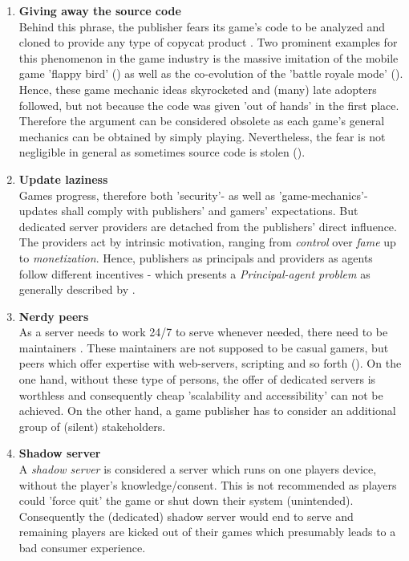 \begin{enumerate}
	\item \textbf{Giving away the source code} \\
	Behind this phrase, the publisher fears its game's code to be analyzed and cloned to provide any type of copycat product \cite[2]{Li.2014}.
	Two prominent examples for this phenomenon in the game industry is the massive imitation of the mobile game 'flappy bird' (\cite{Li.2014})
	as well as the co-evolution of the 'battle royale mode' (\cite{KooistraJ..2018}).
	Hence, these game mechanic ideas skyrocketed and (many) late adopters followed, but not because the code was given 'out of hands' in the first place.
	Therefore the argument can be considered obsolete as each game's general mechanics can be obtained by simply playing.
	Nevertheless, the fear is not negligible in general as sometimes source code is stolen (\cite{vice.com.2021}).
	
	\item \textbf{Update laziness} \\
	Games progress, therefore both 'security'- as well as 'game-mechanics'-updates
	shall comply with publishers' and gamers' expectations.
	But dedicated server providers are detached from the publishers' direct influence.
	The providers act by intrinsic motivation, ranging from \textit{control} over \textit{fame} up to \textit{monetization}.
	Hence, publishers as principals and providers as agents follow different incentives - which presents a \textit{Principal-agent problem} as generally described by \citet{STIGLITZ.1989}.
	
	\item \textbf{Nerdy peers} \\
	As a server needs to work 24/7 to serve whenever needed, there need to be maintainers \cite[211]{Lowell.2004}.
	These maintainers are not supposed to be casual gamers, but peers which offer expertise with web-servers, scripting and so forth (\cite{teamfortress.com.2021}).
	On the one hand, without these type of persons, the offer of dedicated servers is worthless and
	consequently cheap 'scalability and accessibility' can not be achieved.
	On the other hand, a game publisher has to consider an additional group of (silent) stakeholders.
	
	\item \textbf{Shadow server} \\
	A \textit{shadow server} is considered a server which runs on one players device, without the player's knowledge/consent.
	This is not recommended as players could 'force quit' the game or shut down their system (unintended).
	Consequently the (dedicated) shadow server would end to serve and remaining players are kicked out of their games which presumably leads to a bad consumer experience.
	

\end{enumerate}
